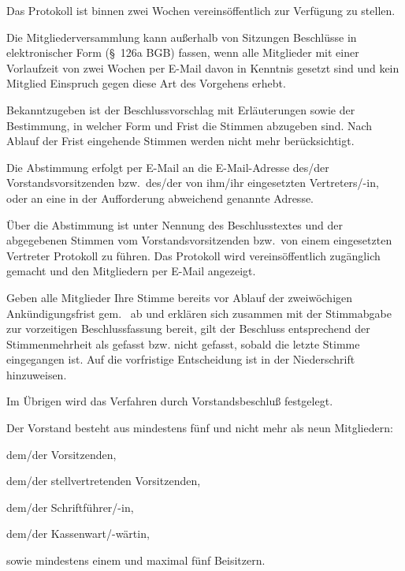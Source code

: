 \documentclass[draft]{scrartcl}
\begin{document}
\begin{contract}
Das Protokoll ist binnen zwei Wochen vereinsöffentlich zur Verfügung zu
stellen.

\label{AusserordentlicheBeschluesse}

Die Mitgliederversammlung kann außerhalb von Sitzungen Beschlüsse in
elektronischer Form (§~126a BGB) fassen, wenn alle Mitglieder mit einer
Vorlaufzeit von zwei Wochen per E-Mail davon in Kenntnis gesetzt
sind und kein Mitglied Einspruch gegen diese Art des Vorgehens erhebt.\label{eBeschluss}

Bekanntzugeben ist der Beschlussvorschlag mit Erläuterungen sowie der
Bestimmung, in welcher Form und Frist die Stimmen abzugeben sind. Nach Ablauf
der Frist eingehende Stimmen werden nicht mehr berücksichtigt.

Die Abstimmung erfolgt per E-Mail an die E-Mail-Adresse des/der
Vorstandsvorsitzenden bzw.\ des/der von ihm/ihr eingesetzten Vertreters/-in,
oder an eine in der Auf\/forderung abweichend genannte Adresse.

Über die Abstimmung ist unter Nennung des Beschlusstextes und der abgegebenen
Stimmen vom Vorstandsvorsitzenden bzw.\ von einem eingesetzten Vertreter
Protokoll zu führen. Das Protokoll wird vereinsöffentlich zugänglich gemacht
und den Mitgliedern per E-Mail angezeigt.

Geben alle Mitglieder Ihre Stimme bereits vor Ablauf der zweiwöchigen
An\-kün\-di\-gungs\-frist gem.~ ab und erklären sich
zusammen mit der Stimmabgabe zur vorzeitigen Beschlussfassung bereit, gilt der
Beschluss entsprechend der Stimmenmehrheit als gefasst bzw. nicht gefasst, sobald
die letzte Stimme eingegangen ist. Auf die vorfristige Entscheidung ist in der
Niederschrift hinzuweisen.

Im Übrigen wird das Verfahren durch Vorstandsbeschluß festgelegt.


Der Vorstand besteht aus mindestens fünf und nicht mehr als neun Mitgliedern:
\begin{compactenum}[\hspace{2em}1.]
  \item dem/der Vorsitzenden,
  \item dem/der stellvertretenden Vorsitzenden,
  \item dem/der Schriftführer/-in,
  \item dem/der Kassenwart/-wärtin,
  \item sowie mindestens einem und maximal fünf Beisitzern.
\end{compactenum}


\end{contract}
\end{document}
